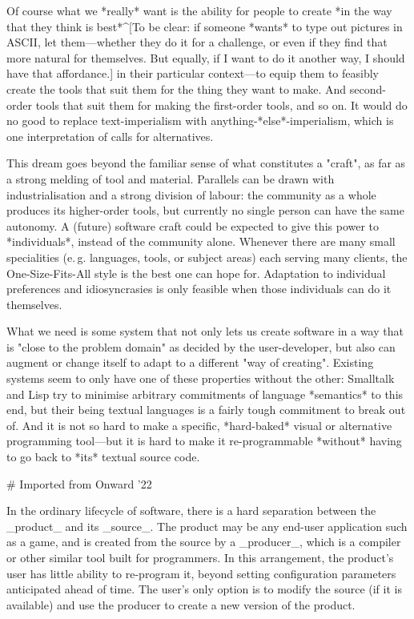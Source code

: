 \documentclass[ twoside,openright,titlepage,numbers=noenddot,headinclude,footinclude,cleardoublepage=empty,abstract=on,
                BCOR=5mm,paper=a4,fontsize=11pt
                ]{scrreprt}
\newcommand{\eg}{e.\,g.}
\newcommand{\OSFA}{One-Size-Fits-All}
\theoremstyle{definition}
\begin{document}
{Of course what we *really* want is the ability for people to create *in the way that they think is best*^[To be clear: if someone *wants* to type out pictures in ASCII, let them---whether they do it for a challenge, or even if they find that more natural for themselves. But equally, if I want to do it another way, I should have that affordance.] in their particular context---to equip them to feasibly create the tools that suit them for the thing they want to make. And second-order tools that suit them for making the first-order tools, and so on. It would do no good to replace text-imperialism with anything-*else*-imperialism, which is one interpretation of calls for alternatives.

This dream goes beyond the familiar sense of what constitutes a "craft", as far as a strong melding of tool and material. Parallels can be drawn with industrialisation and a strong division of labour: the community as a whole produces its higher-order tools, but currently no single person can have the same autonomy. A (future) software craft could be expected to give this power to *individuals*, instead of the community alone. Whenever there are many small specialities (\eg{} languages, tools, or subject areas) each serving many clients, the \OSFA{} style is the best one can hope for. Adaptation to individual preferences and idiosyncrasies is only feasible when those individuals can do it themselves.

What we need is some system that not only lets us create software in a way that is "close to the problem domain" as decided by the user-developer, but also can augment or change itself to adapt to a different "way of creating". Existing systems seem to only have one of these properties without the other: Smalltalk and Lisp try to minimise arbitrary commitments of language *semantics* to this end, but their being textual languages is a fairly tough commitment to break out of. And it is not so hard to make a specific, *hard-baked* visual or alternative programming tool---but it is hard to make it re-programmable *without* having to go back to *its* textual source code.

# Imported from Onward '22

In the ordinary lifecycle of software, there is a hard separation between the _product_ and its _source_. The product may be any end-user application such as a game, and is created from the source by a _producer_, which is a compiler or other similar tool built for programmers. In this arrangement, the product's user has little ability to re-program it, beyond setting configuration parameters anticipated ahead of time. The user's only option is to modify the source (if it is available) and use the producer to create a new version of the product.

}
\end{document}
